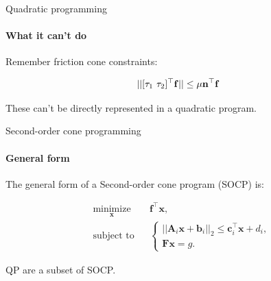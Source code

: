 \documentclass{beamer}
\begin{document}
\begin{frame}{Quadratic programming}
\framesubtitle{What it can't do}
\begin{flushleft}

Remember friction cone constraints:

\begin{equation}
\label{eq:friction_cone_2}
    || [\tau_1 \ \tau_2]^\top \mathbf{f} || \leq \mu \mathbf{n}^\top \mathbf{f}
\end{equation}

These can't be directly represented in a quadratic program.

\end{flushleft}
\end{frame}



\begin{frame}{Second-order cone programming}
\framesubtitle{General form}
\begin{flushleft}

The general form of a Second-order cone program (SOCP) is:

%
\begin{equation}
\begin{aligned}
& \underset{\mathbf{x}}{\text{minimize}}
& & \mathbf{f}^\top\mathbf{x}, \\
& \text{subject to}
& & \begin{cases}
    ||\mathbf{A}_i\mathbf{x} + \mathbf{b}_i||_2 \leq 
     \mathbf{c}_i^\top \mathbf{x} + d_i, \\
    \mathbf{F}\mathbf{x} = g.
    \end{cases}
\end{aligned}
\end{equation}

QP are a subset of SOCP.
 
\end{flushleft}
\end{frame}
\end{document}
